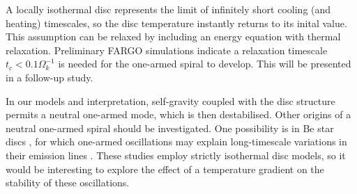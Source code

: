 A locally isothermal disc represents the limit of infinitely short
cooling (and heating) timescales, so the disc temperature instantly
returns to its inital value. %
This assumption can be relaxed by including an energy
equation with thermal relaxation. Preliminary FARGO simulations
indicate a relaxation timescale $t_c < 0.1\Omega_k^{-1}$ is needed for
the one-armed spiral to develop. This will be presented in a follow-up
study. %

In our models and interpretation, self-gravity coupled with the disc 
structure permits a neutral one-armed mode, which is then
destabilised. Other origins of a neutral
one-armed spiral should be investigated. One possibility is in Be star discs
\citep{rivinius13}, for which 
one-armed oscillations may explain long-timescale variations in their
emission lines \citep[see e.g.][and references
therein]{okasaki97,papaloizou06c,ogilvie08}. These studies employ
strictly isothermal disc models, so it would be interesting to explore
the effect of a temperature gradient on the stability of these
oscillations. 



